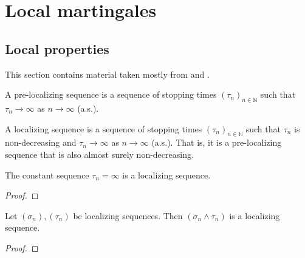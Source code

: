 \chapter{Local martingales}

\section{Local properties}

This section contains material taken mostly from \cite[Chapters 10 and 18]{kallenberg2021} and \cite{almostsuremath}.


\begin{definition}\label{def:preLocalizingSequence}
  \mathlibok
A pre-localizing sequence is a sequence of stopping times $(\tau_n)_{n \in \mathbb{N}}$ such that $\tau_n \to \infty$ as $n \to \infty$ (a.s.).
\end{definition}


\begin{definition}\label{def:localizingSequence}
  \mathlibok
A localizing sequence is a sequence of stopping times $(\tau_n)_{n \in \mathbb{N}}$ such that $\tau_n$ is non-decreasing and $\tau_n \to \infty$ as $n \to \infty$ (a.s.).
That is, it is a pre-localizing sequence that is also almost surely non-decreasing.
\end{definition}


\begin{lemma}\label{lem:localizingSequence_const_top}
  \mathlibok
The constant sequence $\tau_n = \infty$ is a localizing sequence.
\end{lemma}

\begin{proof}\mathlibok

\end{proof}


\begin{lemma}\label{lem:localizingSequence_min}
  \mathlibok
Let $(\sigma_n), (\tau_n)$ be localizing sequences.
Then $(\sigma_n \wedge \tau_n)$ is a localizing sequence.
\end{lemma}

\begin{proof}\mathlibok

\end{proof}


